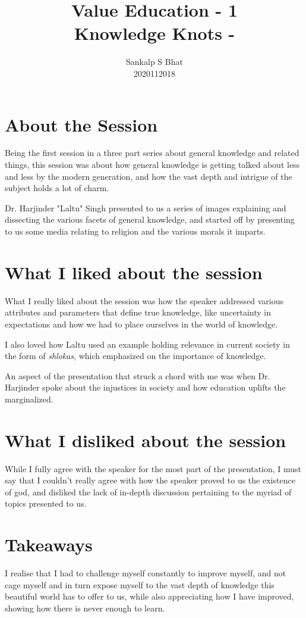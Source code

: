 \documentclass[a4paper, 12pt]{extarticle}
\title{Value Education - 1\\
Knowledge Knots - \uppercase\expandafter{\romannumeral1\relax}}
\author{Sankalp S Bhat\\
2020112018
}
\begin{document}
\maketitle
\thispagestyle{empty}

\section*{About the Session}
Being the first session in a three part series about general knowledge and related things, this session was about how general knowledge is getting talked about less and less by the modern generation, and how the vast depth and intrigue of the subject holds a lot of charm.

Dr. Harjinder "Laltu" Singh presented to us a series of images explaining and dissecting the various facets of general knowledge, and started off by presenting to us some media relating to religion and the various morals it imparts.
      
\section*{What I liked about the session}

What I really liked about the session was how the speaker addressed various attributes and parameters that define true knowledge, like uncertainty in expectations and how we had to place ourselves in the world of knowledge.
    
I also loved how Laltu used an example holding relevance in current society in the form of \textit{shlokas}, which emphasized on the importance of knowledge.

An aspect of the presentation that struck a chord with me was when Dr. Harjinder spoke about the injustices in society and how education uplifts the marginalized.

 \section*{What I disliked about the session}
 
While I fully agree with the speaker for the most part of the presentation, I must say that I couldn't really agree with how the speaker proved to us the existence of god, and disliked the lack of in-depth discussion pertaining to the myriad of topics presented to us.

\section*{Takeaways}
    
I realise that I had to challenge myself constantly to improve myself, and not cage myself and in turn expose myself to the vast depth of knowledge this beautiful world has to offer to us, while also appreciating how I have improved, showing how there is never enough to learn.
\end{document}
